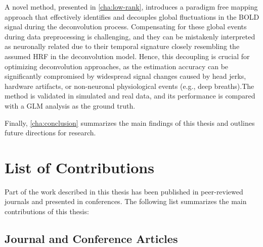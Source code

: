 A novel method, presented in \cref{cha:low-rank}, introduces a paradigm free
mapping approach that effectively identifies and decouples global fluctuations
in the BOLD signal during the deconvolution process. Compensating for these
global events during data preprocessing is challenging, and they can be
mistakenly interpreted as neuronally related due to their temporal signature
closely resembling the assumed HRF in the deconvolution model. Hence, this
decoupling is crucial for optimizing deconvolution approaches, as the estimation
accuracy can be significantly compromised by widespread signal changes caused by
head jerks, hardware artifacts, or non-neuronal physiological events (e.g., deep
breaths).The method is validated in simulated and real data, and its performance
is compared with a GLM analysis as the ground truth.

Finally, \cref{cha:conclusion} summarizes the main findings of this thesis and
outlines future directions for research.

\section{List of Contributions}

Part of the work described in this thesis has been published in peer-reviewed
journals and presented in conferences. The following list summarizes the main
contributions of this thesis:

\subsection{Journal and Conference Articles}

